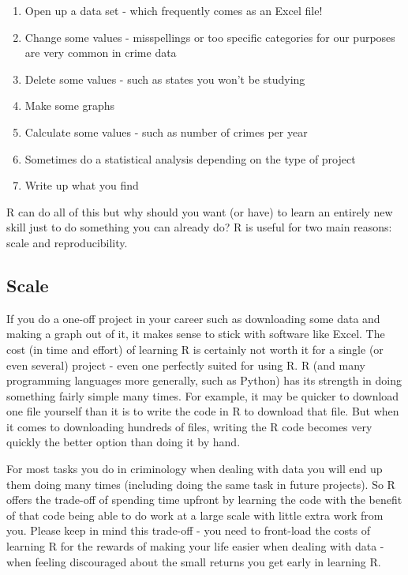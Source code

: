 \documentclass[
]{krantz}
\providecommand{\tightlist}{%
  \setlength{\itemsep}{0pt}\setlength{\parskip}{0pt}}
\begin{document}
\begin{enumerate}
\def\labelenumi{\arabic{enumi}.}
\tightlist
\item
  Open up a data set - which frequently comes as an Excel file!
\item
  Change some values - misspellings or too specific categories for our purposes are very common in crime data
\item
  Delete some values - such as states you won't be studying
\item
  Make some graphs
\item
  Calculate some values - such as number of crimes per year
\item
  Sometimes do a statistical analysis depending on the type of project
\item
  Write up what you find
\end{enumerate}

R can do all of this but why should you want (or have) to learn an entirely new skill just to do something you can already do? R is useful for two main reasons: scale and reproducibility.

\hypertarget{scale}{%
\subsection{Scale}\label{scale}}

If you do a one-off project in your career such as downloading some data and making a graph out of it, it makes sense to stick with software like Excel. The cost (in time and effort) of learning R is certainly not worth it for a single (or even several) project - even one perfectly suited for using R. R (and many programming languages more generally, such as Python) has its strength in doing something fairly simple many times. For example, it may be quicker to download one file yourself than it is to write the code in R to download that file. But when it comes to downloading hundreds of files, writing the R code becomes very quickly the better option than doing it by hand.

For most tasks you do in criminology when dealing with data you will end up them doing many times (including doing the same task in future projects). So R offers the trade-off of spending time upfront by learning the code with the benefit of that code being able to do work at a large scale with little extra work from you. Please keep in mind this trade-off - you need to front-load the costs of learning R for the rewards of making your life easier when dealing with data - when feeling discouraged about the small returns you get early in learning R.
\end{document}
